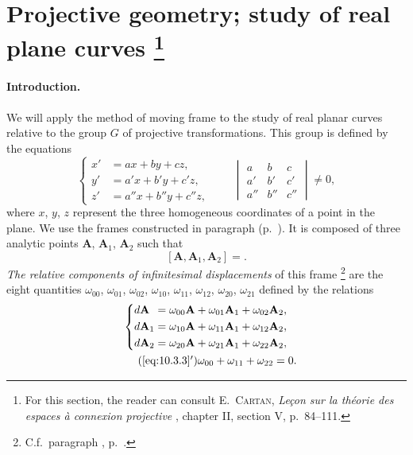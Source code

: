 \section[{Projective geometry; study of real plane curves}]{Projective geometry; study of real plane curves \footnote{For this section, the reader can consult \textsc{E.~Cartan}, \emph{Leçon sur la théorie des espaces à connexion projective} \cite{20}, chapter II, section V, p.~84--111.}}
\label{sec:proj-geom-study}

\paragraph{Introduction.}
\label{sec:141}
We will apply the method of moving frame to the study of real planar curves relative to the group $G$ of projective transformations. This group is defined by the equations
\setcounter{equation}{0}
\begin{equation}
  \label{eq:10.3.1}
  \left\{
    \begin{aligned}
      x'&=ax+by+cz,\\
      y'&=a'x+b'y+c'z,\\
      z'&=a''x+b''y+c''z,
    \end{aligned}
  \right.
  \qquad
  \begin{vmatrix}
    a&b&c\\
    a'&b'&c'\\
    a''&b''&c''
  \end{vmatrix}
  \neq 0,
\end{equation}
where $x$, $y$, $z$ represent the three homogeneous coordinates of a point in the plane. We use the frames constructed in paragraph  (p.~\pageref{sec:67}). It is composed of three analytic points $\mathbf{A}$, $\mathbf{A}_{1}$, $\mathbf{A}_{2}$ such that
\begin{equation}
  \label{eq:10.3.2}
  [\mathbf{A},\mathbf{A}_{1},\mathbf{A}_{2}]=.
\end{equation}
\emph{The relative components of infinitesimal displacements} of this frame \footnote{C.f.~paragraph , p.~\pageref{sec:73}.} are the eight quantities $\omega_{00}$, $\omega_{01}$, $\omega_{02}$, $\omega_{10}$, $\omega_{11}$, $\omega_{12}$, $\omega_{20}$, $\omega_{21}$ defined by the relations
\begin{gather}
  \label{eq:10.3.3}
  \left\{
    \begin{aligned}
      d\mathbf{A}_{\phantom{0}}&=\omega_{00}\mathbf{A}+\omega_{01}\mathbf{A}_{1}+\omega_{02}\mathbf{A}_{2},\\
      d\mathbf{A}_{1}&=\omega_{10}\mathbf{A}+\omega_{11}\mathbf{A}_{1}+\omega_{12}\mathbf{A}_{2},\\
      d\mathbf{A}_{2}&=\omega_{20}\mathbf{A}+\omega_{21}\mathbf{A}_{1}+\omega_{22}\mathbf{A}_{2},
    \end{aligned}
  \right.
  \\
  \label{eq:10.3.3'}\tag{\ref{eq:10.3.3}$'$}
  \omega_{00}+\omega_{11}+\omega_{22}=0.
\end{gather}

